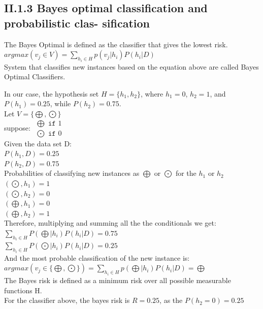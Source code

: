 \documentclass{article}
\theoremstyle{dotless}
\newcounter{min}
\begin{document}
\subsection{II.1.3 Bayes optimal classification and probabilistic clas-
sification}

The Bayes Optimal is defined as the classifier that gives the lowest risk.\\

$argmax(v_j\in V)=\sum_{h_i\in H}{p(v_j|h_i)P(h_i|D)}$\\

System that classifies new instances based on the equation above are called Bayes Optimal Classifiers.

In our case, the hypothesis set $H=\{h_1, h_2\}$, where $h_1=0$, $h_2=1$, and $P(h_1)=0.25$, while $P(h_2)=0.75$.\\

Let $V=\{\bigoplus,\bigodot\}$\\
suppose: $\begin{matrix}\bigoplus\texttt{ if }1\\
\bigodot\texttt{ if }0\end{matrix}$\\

Given the data set D:\\
$P(h_1, D ) = 0.25$\\
$P(h_2, D ) = 0.75$\\

Probabilities of classifying new instances as $\bigoplus$ or $\bigodot$ for the $h_1$ or $h_2$\\
$(\bigodot, h_1) = 1$\\
$(\bigodot, h_2) = 0$\\
$(\bigoplus, h_1) = 0$\\
$(\bigoplus, h_2) = 1$\\

Therefore, multiplying and summing all the the conditionals we get:\\
$\sum_{h_i\in H}{P(\bigoplus|h_i)P(h_i|D)} = 0.75$\\
$\sum_{h_i\in H}{P(\bigodot|h_i)P(h_i|D)} = 0.25$\\

And the most probable classification of the new instance is:\\
$argmax(v_j\in\{\bigoplus,\bigodot\})=\sum_{h_i\in H}{p(\bigoplus|h_i)P(h_i|D)}=\bigoplus$\\

The Bayes risk is defined as a minimum risk over all possible measurable functions H.\\
For the classifier above, the bayes risk is $R=0.25$, as the $P(h_2=0) = 0.25$\\
\end{document}
